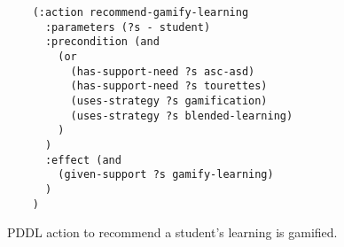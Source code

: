 \begin{figure}[t]
    \begin{lstlisting}
    (:action recommend-gamify-learning
      :parameters (?s - student)
      :precondition (and
        (or
          (has-support-need ?s asc-asd)
          (has-support-need ?s tourettes)
          (uses-strategy ?s gamification)
          (uses-strategy ?s blended-learning)
        )
      )
      :effect (and 
        (given-support ?s gamify-learning)
      )
    )
    \end{lstlisting}
    \caption{PDDL action to recommend a student's learning is gamified.}\label{fig:gamify-learning}
\end{figure}